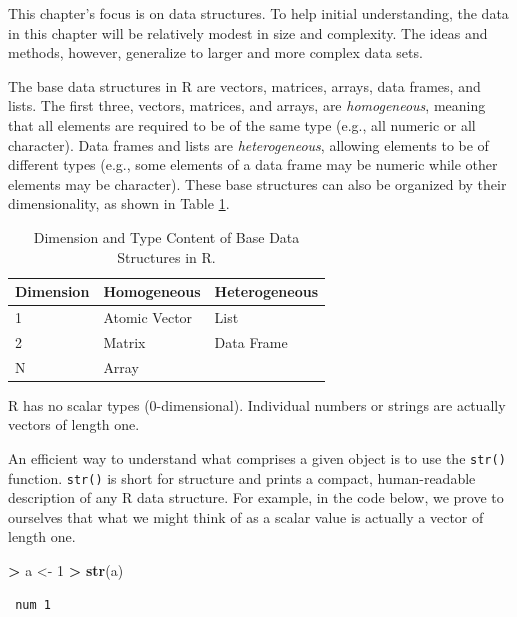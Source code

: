 \documentclass[]{krantz}
\makeatletter
\newenvironment{Shaded}{\begin{snugshade}}{\end{snugshade}}
\newcommand{\DecValTok}[1]{\textcolor[rgb]{0.06,0.06,0.06}{#1}}
\newcommand{\KeywordTok}[1]{\textcolor[rgb]{0.27,0.27,0.27}{\textbf{#1}}}
\newcommand{\NormalTok}[1]{#1}
\newcommand{\OperatorTok}[1]{\textcolor[rgb]{0.43,0.43,0.43}{\textbf{#1}}}
\newcommand{\StringTok}[1]{\textcolor[rgb]{0.5,0.5,0.5}{#1}}
\newenvironment{kframe}{%
\medskip{}
\setlength{\fboxsep}{.8em}
 \def\at@end@of@kframe{}%
 \ifinner\ifhmode%
  \def\at@end@of@kframe{\end{minipage}}%
  \begin{minipage}{\columnwidth}%
 \fi\fi%
 \def\FrameCommand##1{\hskip\@totalleftmargin \hskip-\fboxsep
 \colorbox{shadecolor}{##1}\hskip-\fboxsep
     \hskip-\linewidth \hskip-\@totalleftmargin \hskip\columnwidth}%
 \MakeFramed {\advance\hsize-\width
   \@totalleftmargin\z@ \linewidth\hsize
   \@setminipage}}%
 {\par\unskip\endMakeFramed%
 \at@end@of@kframe}
\renewenvironment{Shaded}{\begin{kframe}}{\end{kframe}}
\makeatother
\begin{document}
This chapter's focus is on data structures. To help initial understanding, the data in this chapter will be relatively modest in size and complexity. The ideas and methods, however, generalize to larger and more complex data sets.

The base data structures in R are vectors, matrices, arrays, data frames, and lists. The first three, vectors, matrices, and arrays, are \emph{homogeneous}, meaning that all elements are required to be of the same type (e.g., all numeric or all character). Data frames and lists are \emph{heterogeneous}, allowing elements to be of different types (e.g., some elements of a data frame may be numeric while other elements may be character). These base structures can also be organized by their dimensionality, as shown in Table \ref{tab:dataStructures}.

\begin{table}[t]

\caption{\label{tab:dataStructures}Dimension and Type Content of Base Data Structures in R.}
\centering
\begin{tabular}{lll}
\toprule
Dimension & Homogeneous & Heterogeneous\\
\midrule
1 & Atomic Vector & List\\
2 & Matrix & Data Frame\\
N & Array & \\
\bottomrule
\end{tabular}
\end{table}

R has no scalar types (0-dimensional). Individual numbers or strings are actually vectors of length one.

An efficient way to understand what comprises a given object is to use the \texttt{str()} function. \texttt{str()} is short for structure and prints a compact, human-readable description of any R data structure. For example, in the code below, we prove to ourselves that what we might think of as a scalar value is actually a vector of length one.

\begin{Shaded}
\begin{Highlighting}[]
\OperatorTok{>}\StringTok{ }\NormalTok{a <-}\StringTok{ }\DecValTok{1}
\OperatorTok{>}\StringTok{ }\KeywordTok{str}\NormalTok{(a)}
\end{Highlighting}
\end{Shaded}

\begin{verbatim}
 num 1
\end{verbatim}
\end{document}
